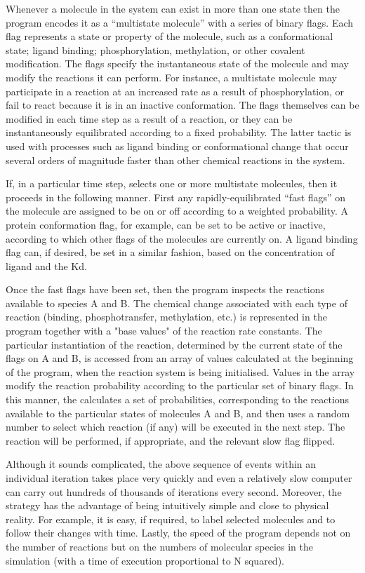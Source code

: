 Whenever a molecule in the system can exist in more than one state then the 
program encodes it as a ``multistate molecule'' with a series of binary flags. 
Each flag represents a state or property of the molecule, such as a 
conformational state; ligand binding; phosphorylation, methylation, or other 
covalent modification. The flags specify the instantaneous state of the 
molecule and may modify the reactions it can perform. For instance, a 
multistate molecule may participate in a reaction at an increased rate as a
result of phosphorylation, or fail to react because it is in an inactive 
conformation. The flags themselves can be modified in each time step as a 
result of a reaction, or they can be instantaneously equilibrated according to 
a fixed probability. The latter tactic is used with processes such as ligand 
binding or conformational change that occur several orders of magnitude faster 
than other chemical reactions in the system. 

If, in a particular time step, \stochsim{} selects one or more multistate 
molecules, then it proceeds in the following manner. First any 
rapidly-equilibrated ``fast flags'' on the molecule are assigned to be on or 
off according to a weighted probability. A protein conformation flag, for 
example, can be set to be active or inactive, according to which other flags 
of the molecules are currently on. A ligand binding flag can, if desired, be 
set in a similar fashion, based on the concentration of ligand and the Kd. 

Once the fast flags have been set, then the program inspects the reactions 
available to species A and B. The chemical change associated with each type of 
reaction (binding, phosphotransfer, methylation, etc.) is represented in the 
program together with a "base values" of the reaction rate constants. The 
particular instantiation of the reaction, determined by the current state of 
the flags on A and B, is accessed from an array of values calculated at the 
beginning of the program, when the reaction system is being initialised. 
Values in the array modify the reaction probability according to the particular
set of binary flags. In this manner, the \stochsim{} calculates a set of 
probabilities, corresponding to the reactions available to the particular 
states of molecules A and B, and then uses a random number to select which 
reaction (if any) will be executed in the next step. The reaction will be 
performed, if appropriate, and the relevant slow flag flipped. 

Although it sounds complicated, the above sequence of events within an 
individual iteration takes place very quickly and even a relatively slow 
computer can carry out hundreds of thousands of iterations every second. 
Moreover, the strategy has the advantage of being intuitively simple and close 
to physical reality. For example, it is easy, if required, to label selected
molecules and to follow their changes with time. Lastly, the speed of the 
program depends not on the number of reactions but on the numbers of molecular 
species in the simulation (with a time of execution proportional to N squared).
  
